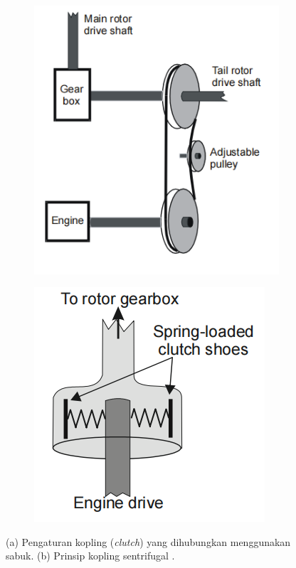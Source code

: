\begin{figure}[H]
	\begin{subfigure}{0.3\textwidth}
	\centering
	\includegraphics[width=\linewidth]{gambar/belt-driven_clutch.png}
	\caption{}
	\label{fig:belt-driven_clutch}
	\end{subfigure}
\centering
	\begin{subfigure}{0.3\textwidth}
	\centering
	\includegraphics[width=\linewidth]{gambar/centrifugal_clutch.png}
	\caption{}
	\label{fig:centrifugal_clutch}
\end{subfigure}
	\caption{(a) Pengaturan kopling (\textit{clutch}) yang dihubungkan menggunakan sabuk. (b) Prinsip kopling sentrifugal \cite{handbook}.}
	\label{fig:clutch}
\end{figure}

